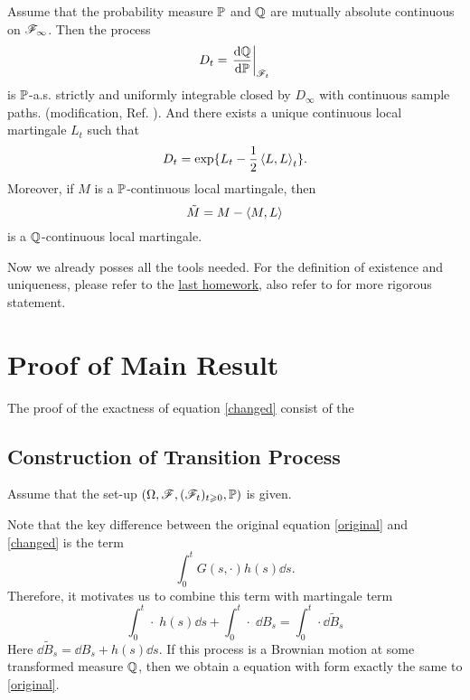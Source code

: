 \documentclass[8pt,onesided]{article}
\begin{document}
\begin{theorem}
     Assume that the probability measure $\mathbb{P}$ and $\mathbb{Q}$ are mutually absolute continuous on $\mathscr{F}_{\infty}$. Then the process
    \begin{equation*}
        D_t=\left. \frac{\mathrm{d} \mathbb{Q} }{\mathrm{d} \mathbb{P}}\right|_{\mathscr{F}_t}
    \end{equation*}
    is $\mathbb{P}$-a.s. strictly and uniformly integrable closed by $D_{\infty}$ with continuous sample paths. (modification, Ref. \cite{gall2016brownian}). And there exists a unique continuous local martingale $L_t$ such that
    \begin{equation*}
        D_t=\exp\{L_t -\frac{1}{2} \left\langle L,L\right\rangle_t\}.
    \end{equation*}
    Moreover, if $M$ is a $\mathbb{P}$-continuous local martingale, then
    \begin{equation*}
        \tilde{M}=M-\left\langle M,L\right\rangle
    \end{equation*}
    is a $\mathbb{Q}$-continuous local martingale.
\end{theorem}

Now we already posses all the tools needed. For the definition of existence and uniqueness, please refer to the \href{https://github.com/beiningwu7/homeworks_for_MATH6424P/blob/main/homework_1.pdf}{last homework}, also refer to \cite{rogers2000diffusions2} for more rigorous statement. 



\section{Proof of Main Result}

The proof of the exactness of equation \ref{changed} consist of the


\subsection{Construction of Transition Process}

Assume that the set-up $(\Omega,\mathscr{F},(\mathscr{F}_t)_{t\geqslant 0}, \mathbb{P})$ is given. 

Note that the key difference between the original equation \ref{original} and \ref{changed} is the term
\begin{equation*}
    \int_0^t G(s,\cdot)h(s) \dd s.
\end{equation*}
Therefore, it motivates us to combine this term with martingale term
\begin{equation*}
    \int_0^t \cdot\; h(s)\dd s + \int_0^t \cdot \;\dd B_s =\int_0^t \cdot \dd \tilde{B}_s
\end{equation*}
Here $\dd \tilde{B}_s= \dd B_s + h(s)\dd s$. If this process is a Brownian motion at some transformed measure $\mathbb{Q}$, then we obtain a equation with form exactly the same to \ref{original}. 
\end{document}
